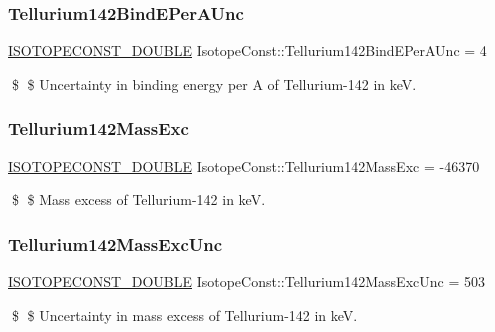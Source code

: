 \subsubsection{\texorpdfstring{Tellurium142\+Bind\+E\+Per\+A\+Unc}{Tellurium142BindEPerAUnc}}
{\footnotesize\ttfamily \mbox{\hyperlink{group___isotope_const-_macros_ga8f45a7272ce02c0b4c65c44636ed719a}{I\+S\+O\+T\+O\+P\+E\+C\+O\+N\+S\+T\+\_\+\+D\+O\+U\+B\+LE}} Isotope\+Const\+::\+Tellurium142\+Bind\+E\+Per\+A\+Unc = 4}

\$ \$ Uncertainty in binding energy per A of Tellurium-\/142 in keV. \mbox{\label{group___isotope_const-_tellurium-_te142_ga7467fd949e9acfbff9c1ae9396964a70}} 
\subsubsection{\texorpdfstring{Tellurium142\+Mass\+Exc}{Tellurium142MassExc}}
{\footnotesize\ttfamily \mbox{\hyperlink{group___isotope_const-_macros_ga8f45a7272ce02c0b4c65c44636ed719a}{I\+S\+O\+T\+O\+P\+E\+C\+O\+N\+S\+T\+\_\+\+D\+O\+U\+B\+LE}} Isotope\+Const\+::\+Tellurium142\+Mass\+Exc = -\/46370}

\$ \$ Mass excess of Tellurium-\/142 in keV. \mbox{\label{group___isotope_const-_tellurium-_te142_ga778c3f23f9a65fb401e5f7ee7e37272b}} 
\subsubsection{\texorpdfstring{Tellurium142\+Mass\+Exc\+Unc}{Tellurium142MassExcUnc}}
{\footnotesize\ttfamily \mbox{\hyperlink{group___isotope_const-_macros_ga8f45a7272ce02c0b4c65c44636ed719a}{I\+S\+O\+T\+O\+P\+E\+C\+O\+N\+S\+T\+\_\+\+D\+O\+U\+B\+LE}} Isotope\+Const\+::\+Tellurium142\+Mass\+Exc\+Unc = 503}

\$ \$ Uncertainty in mass excess of Tellurium-\/142 in keV. \mbox{\label{group___isotope_const-_tellurium-_te142_ga67472203defa7bac6713ce1dfcca6238}} 
